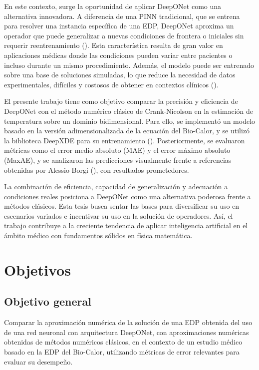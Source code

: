 \documentclass[
  spanish,
  us-letterpaper,
]{scrreprt}
\theoremstyle{definition}
\theoremstyle{plain}
\theoremstyle{remark}
\begin{document}
En este contexto, surge la oportunidad de aplicar DeepONet como una
alternativa innovadora. A diferencia de una PINN tradicional, que se
entrena para resolver una instancia específica de una EDP, DeepONet
aproxima un operador que puede generalizar a nuevas condiciones de
frontera o iniciales sin requerir reentrenamiento
(). Esta característica
resulta de gran valor en aplicaciones médicas donde las condiciones
pueden variar entre pacientes o incluso durante un mismo procedimiento.
Además, el modelo puede ser entrenado sobre una base de soluciones
simuladas, lo que reduce la necesidad de datos experimentales, difíciles
y costosos de obtener en contextos clínicos
().

El presente trabajo tiene como objetivo comparar la precisión y
eficiencia de DeepONet con el método numérico clásico de Crank-Nicolson
en la estimación de temperatura sobre un dominio bidimensional. Para
ello, se implementó un modelo basado en la versión adimensionalizada de
la ecuación del Bio-Calor, y se utilizó la biblioteca DeepXDE para su
entrenamiento ().
Posteriormente, se evaluaron métricas como el error medio absoluto (MAE)
y el error máximo absoluto (MaxAE), y se analizaron las predicciones
visualmente frente a referencias obtenidas por Alessio Borgi
(), con resultados prometedores.

La combinación de eficiencia, capacidad de generalización y adecuación a
condiciones reales posiciona a DeepONet como una alternativa poderosa
frente a métodos clásicos. Esta tesis busca sentar las bases para
diversificar su uso en escenarios variados e incentivar su uso en la
solución de operadores. Así, el trabajo contribuye a la creciente
tendencia de aplicar inteligencia artificial en el ámbito médico con
fundamentos sólidos en física matemática.


\chapter{Objetivos}\label{objetivos}

\section{Objetivo general}\label{objetivo-general}

Comparar la aproximación numérica de la solución de una EDP obtenida del
uso de una red neuronal con arquitectura DeepONet, con aproximaciones
numéricas obtenidas de métodos numéricos clásicos, en el contexto de un
estudio médico basado en la EDP del Bio-Calor, utilizando métricas de
error relevantes para evaluar su desempeño.
\end{document}
